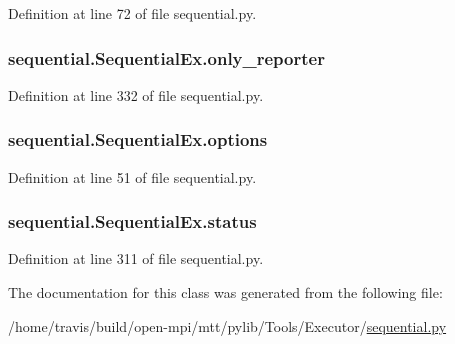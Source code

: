 Definition at line 72 of file sequential.\-py.

\hypertarget{classsequential_1_1SequentialEx_a7c81be8b211e0e01022948ce0a7d4e19}{
\subsubsection[{only\-\_\-reporter}]{\setlength{\rightskip}{0pt plus 5cm}sequential.\-Sequential\-Ex.\-only\-\_\-reporter}}\label{classsequential_1_1SequentialEx_a7c81be8b211e0e01022948ce0a7d4e19}


Definition at line 332 of file sequential.\-py.

\hypertarget{classsequential_1_1SequentialEx_a72ae94e2c46c2b1b8c5022eaf3593edf}{
\subsubsection[{options}]{\setlength{\rightskip}{0pt plus 5cm}sequential.\-Sequential\-Ex.\-options}}\label{classsequential_1_1SequentialEx_a72ae94e2c46c2b1b8c5022eaf3593edf}


Definition at line 51 of file sequential.\-py.

\hypertarget{classsequential_1_1SequentialEx_a7f8ca8932ced5d9daf6191598894eb58}{
\subsubsection[{status}]{\setlength{\rightskip}{0pt plus 5cm}sequential.\-Sequential\-Ex.\-status}}\label{classsequential_1_1SequentialEx_a7f8ca8932ced5d9daf6191598894eb58}


Definition at line 311 of file sequential.\-py.



The documentation for this class was generated from the following file\-:\begin{DoxyCompactItemize}
\item 
/home/travis/build/open-\/mpi/mtt/pylib/\-Tools/\-Executor/\hyperlink{sequential_8py}{sequential.\-py}\end{DoxyCompactItemize}

